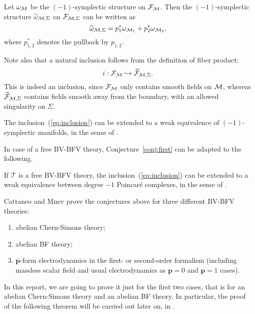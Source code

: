 Let $\omega_{\mathcal{M}}$ be the $(-1)$-symplectic structure on $\mathcal{F}_{\mathcal{M}}$. Then the $(-1)$-symplectic structure $\widetilde{\omega}_{\mathcal{M},\Sigma}$ on $\mathcal{F}_{\mathcal{M},\Sigma}$ can be written as
\begin{equation}
\label{eq:wt_omega}
    \widetilde{\omega}_{\mathcal{M},\Sigma} = 
    p_1^* \omega_{\mathcal{M}_1} + p_2^* \omega_{\mathcal{M}_2} ,
\end{equation}
where $p_{1,2}^*$ denotes the pullback by $p_{1,2}$.

Note also that a natural inclusion follows from the definition of fiber product:
\begin{equation}
\label{eq:inclusion}
    i : \mathcal{F}_{\mathcal{M}} \hookrightarrow \widetilde{\mathcal{F}}_{\mathcal{M},\Sigma} .
\end{equation}
This is indeed an inclusion, since $\mathcal{F}_{\mathcal{M}}$ only contains smooth fields on $\mathcal{M}$, whereas $\widetilde{\mathcal{F}}_{\mathcal{M}, \Sigma}$ contains fields smooth away from the boundary, with an allowed singularity on $\Sigma$.

\begin{conj}
\label{conj:first}
    The inclusion~(\ref{eq:inclusion}) can be extended to a weak equivalence of $(-1)$-symplectic manifolds, in the sense of .
\end{conj}

In case of a free BV-BFV theory, Conjecture~\ref{conj:first} can be adapted to the following.

\begin{conj}
\label{conj:second}
    If $\mathcal{T}$ is a free BV-BFV theory, the inclusion~(\ref{eq:inclusion}) can be extended to a weak equivalence between degree $-1$ Poincaré complexes, in the sense of .
\end{conj}

Cattaneo and Mnev \cite{Gluing_BV-BFV} prove the conjectures above for three different BV-BFV theories:
\begin{enumerate}[label={\arabic*)}]
    \item abelian Chern-Simons theory;
    \item abelian BF theory;
    \item $\mathbf{p}$-form electrodynamics in the first- or second-order formalism (including massless scalar field and usual electrodynamics as $\mathbf{p} = 0$ and $\mathbf{p} = 1$ cases).
\end{enumerate}

In this report, we are going to prove it just for the first two cases, that is for an abelian Chern-Simons theory and an abelian BF theory.
In particular, the proof of the following theorem will be carried out later on, in .

